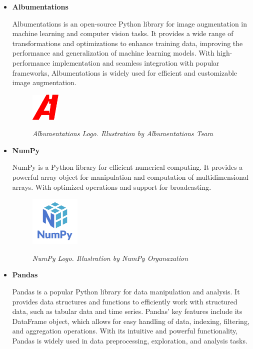 \begin{itemize}
  \item \textbf{Albumentations}

    Albumentations  is an
    open-source Python library for image augmentation in machine learning and
    computer vision tasks. It provides a wide range of transformations and
    optimizations to enhance training data, improving the performance and
    generalization of machine learning models. With high-performance
    implementation and seamless integration with popular frameworks,
    Albumentations is widely used for efficient and customizable image
    augmentation.

    \begin{figure}[H] \centering
      \includegraphics[width=0.13\textwidth]{imatges/studies_and_decisions/albumentations-logo.png}
      \caption[Albumentations Logo]{\textit{Albumentations Logo. Illustration
      by Albumentations Team}} {\label{fig:albumentations-logo}} \end{figure}

    \item \textbf{NumPy}

    NumPy  is a Python library for
    efficient numerical computing. It provides a powerful array object for
    manipulation and computation of multidimensional arrays. With optimized
    operations and support for broadcasting.

    \begin{figure}[H]
      \centering
      \includegraphics[width=0.225\textwidth]{imatges/studies_and_decisions/numpy-logo.png}
      \caption[NumPy Logo]{\textit{NumPy Logo. Illustration by NumPy Organazation}}
      {\label{fig:numpy-logo}}
    \end{figure}

  \item \textbf{Pandas}

    Pandas  is a popular Python library
    for data manipulation and analysis. It provides data structures and
    functions to efficiently work with structured data, such as tabular data
    and time series. Pandas' key features include its DataFrame object, which
    allows for easy handling of data, indexing, filtering, and aggregation
    operations. With its intuitive and powerful functionality, Pandas is widely
    used in data preprocessing, exploration, and analysis tasks.


\end{itemize}
